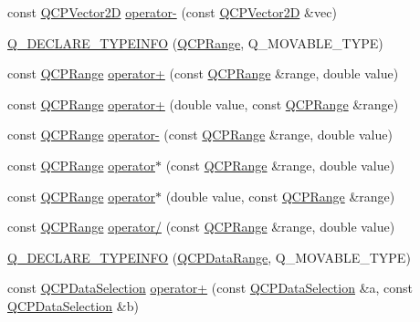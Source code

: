 \begin{DoxyCompactItemize}
\item 
const \hyperlink{class_q_c_p_vector2_d}{Q\+C\+P\+Vector2D} \hyperlink{qcustomplot_8hh_a14c807d345ee3f22d6809bb5a4137b52}{operator-\/} (const \hyperlink{class_q_c_p_vector2_d}{Q\+C\+P\+Vector2D} \&vec)
\item 
\hyperlink{qcustomplot_8hh_aed23afce99cb2c82db7540026f3b7af3}{Q\+\_\+\+D\+E\+C\+L\+A\+R\+E\+\_\+\+T\+Y\+P\+E\+I\+N\+FO} (\hyperlink{class_q_c_p_range}{Q\+C\+P\+Range}, Q\+\_\+\+M\+O\+V\+A\+B\+L\+E\+\_\+\+T\+Y\+PE)
\item 
const \hyperlink{class_q_c_p_range}{Q\+C\+P\+Range} \hyperlink{qcustomplot_8hh_aede14e69c31568a75bd3e9286603c9e0}{operator+} (const \hyperlink{class_q_c_p_range}{Q\+C\+P\+Range} \&range, double value)
\item 
const \hyperlink{class_q_c_p_range}{Q\+C\+P\+Range} \hyperlink{qcustomplot_8hh_aa7dd8efde53d115b7107826194879069}{operator+} (double value, const \hyperlink{class_q_c_p_range}{Q\+C\+P\+Range} \&range)
\item 
const \hyperlink{class_q_c_p_range}{Q\+C\+P\+Range} \hyperlink{qcustomplot_8hh_a797f82830b516646da8873f82e39e356}{operator-\/} (const \hyperlink{class_q_c_p_range}{Q\+C\+P\+Range} \&range, double value)
\item 
const \hyperlink{class_q_c_p_range}{Q\+C\+P\+Range} \hyperlink{qcustomplot_8hh_a558b1248ff6a9e41fd5b2630555a8acc}{operator$\ast$} (const \hyperlink{class_q_c_p_range}{Q\+C\+P\+Range} \&range, double value)
\item 
const \hyperlink{class_q_c_p_range}{Q\+C\+P\+Range} \hyperlink{qcustomplot_8hh_a5cb2332f6957021f47cc768089f4f090}{operator$\ast$} (double value, const \hyperlink{class_q_c_p_range}{Q\+C\+P\+Range} \&range)
\item 
const \hyperlink{class_q_c_p_range}{Q\+C\+P\+Range} \hyperlink{qcustomplot_8hh_a4b366a3a21974c88e09b0d39d4a24a4b}{operator/} (const \hyperlink{class_q_c_p_range}{Q\+C\+P\+Range} \&range, double value)
\item 
\hyperlink{qcustomplot_8hh_a9139711c554711cbce8d84f505061621}{Q\+\_\+\+D\+E\+C\+L\+A\+R\+E\+\_\+\+T\+Y\+P\+E\+I\+N\+FO} (\hyperlink{class_q_c_p_data_range}{Q\+C\+P\+Data\+Range}, Q\+\_\+\+M\+O\+V\+A\+B\+L\+E\+\_\+\+T\+Y\+PE)
\item 
const \hyperlink{class_q_c_p_data_selection}{Q\+C\+P\+Data\+Selection} \hyperlink{qcustomplot_8hh_a49c0217af248959d59abfdd29401b678}{operator+} (const \hyperlink{class_q_c_p_data_selection}{Q\+C\+P\+Data\+Selection} \&a, const \hyperlink{class_q_c_p_data_selection}{Q\+C\+P\+Data\+Selection} \&b)

\end{DoxyCompactItemize}
